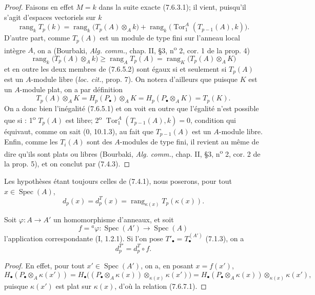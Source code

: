 \begin{proof}
Faisons en effet $M=k$ dans la suite exacte (7.6.3.1); il vient, puisqu'il
s'agit d'espaces vectoriels sur $k$
\[
  \operatorname{rang}_k T_p(k)
  =
  \operatorname{rang}_k\bigl(T_p(A)\otimes_A k\bigr)
  +
  \operatorname{rang}_k\bigl(\operatorname{Tor}_1^A(T_{p-1}(A),k)\bigr).
\]
D'autre part, comme $T_p(A)$ est un module de type fini sur l'anneau local
intègre $A$, on a (Bourbaki, \emph{Alg. comm.}, chap. II, \S 3,
n\textsuperscript{o} 2, cor. 1 de la prop. 4)
\[
  \operatorname{rang}_k\bigl(T_p(A)\otimes_A k\bigr)
  \geq
  \operatorname{rang}_A T_p(A)
  =
  \operatorname{rang}_K\bigl(T_p(A)\otimes_A K\bigr)
  \tag{7.6.5.2}\label{III.7.6.5.2.fr}
\]
et en outre les deux membres de (7.6.5.2) sont égaux si et seulement si $T_p(A)$
est un $A$-module libre (\emph{loc. cit.}, prop. 7). On notera d'ailleurs que
puisque $K$ est un $A$-module plat, on a par définition
\[
  T_p(A)\otimes_A K
  =
  H_p(P_\bullet)\otimes_A K
  =
  H_p(P_\bullet\otimes_A K)
  =
  T_p(K).
\]
On a donc bien l'inégalité (7.6.5.1) et on voit en outre que l'égalité n'est
possible que si : 1\textsuperscript{o} $T_p(A)$ est libre;
2\textsuperscript{o} $\operatorname{Tor}_1^A(T_{p-1}(A),k)=0$, condition qui
équivaut, comme on sait ($0$, 10.1.3), au fait que $T_{p-1}(A)$ est un
$A$-module libre. Enfin, comme les $T_i(A)$ sont des $A$-modules de type fini,
il revient au même de dire qu'ils sont plats ou libres (Bourbaki,
\emph{Alg. comm.}, chap. II, \S 3, n\textsuperscript{o} 2, cor. 2 de la prop.
5), et on conclut par (7.4.3).
\end{proof}

\begin{env}[7.6.6]
Les hypothèses étant toujours celles de (7.4.1), nous poserons, pour tout
$x\in\operatorname{Spec}(A)$,
\[
  d_p(x)=d_p^T(x)=\operatorname{rang}_{\kappa(x)}T_p(\kappa(x)).
  \tag{7.6.6.1}\label{III.7.6.6.1.fr}
\]
\end{env}

\begin{lemma}[7.6.7]
Soit $\varphi:A\to A'$ un homomorphisme d'anneaux, et soit
\[
  f={}^a\!\varphi:
  \operatorname{Spec}(A')\longrightarrow\operatorname{Spec}(A)
\]
l'application correspondante (I, 1.2.1). Si l'on pose
$T'_\bullet=T_\bullet^{(A')}$ (7.1.3), on a
\[
  d_p^{T'}=d_p^T\circ f.
  \tag{7.6.7.1}\label{III.7.6.7.1.fr}
\]
\end{lemma}

\begin{proof}
En effet, pour tout $x'\in\operatorname{Spec}(A')$, on a, en posant
$x=f(x')$,
\[
  H_\bullet(P_\bullet\otimes_A\kappa(x'))
  =
  H_\bullet\bigl((P_\bullet\otimes_A\kappa(x))
    \otimes_{\kappa(x)}\kappa(x')\bigr)
  =
  H_\bullet(P_\bullet\otimes_A\kappa(x))
    \otimes_{\kappa(x)}\kappa(x'),
\]
puisque $\kappa(x')$ est plat sur $\kappa(x)$, d'où la relation (7.6.7.1).
\end{proof}

